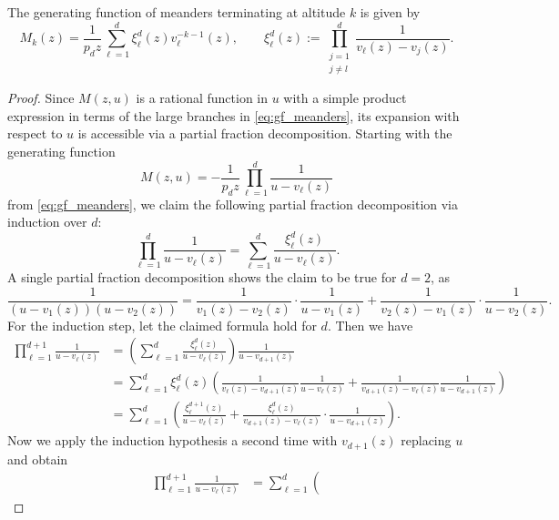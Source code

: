 \begin{corollary} \cite[Corollary 3, p.~51]{Basic} \label{corr:gf_meanders_k}
  The generating function of meanders terminating at altitude $k$ is given by
  \begin{equation*}
    M_{k}(z) = \frac{1}{p_{d}z}\sum_{\ell = 1}^{d} \xi_\ell^d(z) v_{\ell}^{-k-1}(z), \qquad  \xi_\ell^d(z) := \prod_{\substack{j = 1 \\ j \neq l}}^{d} \frac{1}{v_\ell(z) - v_{j}(z)}.
  \end{equation*}
\end{corollary}

\begin{proof}
  Since $M(z,u)$ is a rational function in $u$ with a simple product expression in terms of the large branches in \eqref{eq:gf_meanders}, its expansion with respect to $u$ is accessible via a partial fraction decomposition. 
  Starting with the generating function 
  $$
    M(z,u) = - \frac{1}{p_{d}z}\prod_{\ell = 1}^{d} \frac{1}{u-v_{\ell}(z)}
  $$
  from \eqref{eq:gf_meanders}, we claim the following partial fraction decomposition via induction over $d$:
  $$
  \prod_{\ell=1}^{d} \frac{1}{u-v_{\ell}(z)} = \sum_{\ell=1}^{d} \frac{\xi_\ell^d(z)}{u-v_{\ell}(z)}.
  $$
  A single partial fraction decomposition shows the claim to be true for $d = 2$, as
  $$
  \frac{1}{(u-v_{1}(z))(u-v_{2}(z))} = \frac{1}{v_{1}(z) - v_{2}(z)} \cdot \frac{1}{u - v_{1}(z)} + \frac{1}{v_{2}(z) - v_{1}(z)} \cdot \frac{1}{u - v_{2}(z)}.  
  $$
  For the induction step, let the claimed formula hold for $d$. Then we have
  \begin{align*}
    \prod_{\ell = 1}^{d+1} \frac{1}{u-v_{\ell}(z)} &= 
    \left(
      \sum_{\ell=1}^{d}
      \frac{\xi_\ell^d(z)}{u-v_{\ell}(z)}
    \right) 
    \frac{1}{u-v_{d+1}(z)} \\
    &= \sum_{\ell=1}^{d}
    \xi_\ell^d(z)
    \left(
      \frac{1}{v_{\ell}(z) - v_{d+1}(z)} \frac{1}{u - v_{\ell}(z)} + 
      \frac{1}{v_{d+1}(z) - v_{\ell}(z)} \frac{1}{u - v_{d+1}(z)}
    \right)\\
    &= \sum_{\ell=1}^{d}
    \left(
      \frac{\xi_\ell^{d+1}(z)}{u - v_{\ell}(z)} + 
      \frac{\xi_\ell^{d}(z)}{v_{d+1}(z) - v_{\ell}(z)} \cdot
      \frac{1}{u - v_{d+1}(z)}
    \right).
  \end{align*}
  Now we apply the induction hypothesis a second time with $v_{d+1}(z)$ replacing $u$ and obtain
  \begin{align*}
    \prod_{\ell = 1}^{d+1} \frac{1}{u-v_{\ell}(z)} &= 
    \sum_{\ell=1}^{d}
    \left(

\end{align*}
\end{proof}
